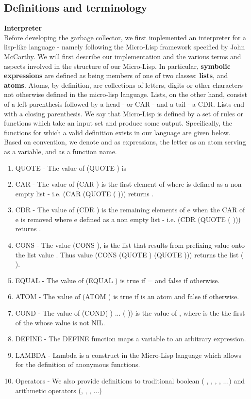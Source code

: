 \documentclass[11pt,leqno]{article}
\newcommand{\mydef}[1]{\textbf{#1}}
\begin{document}
\subsection{Definitions and terminology}
\textbf{Interpreter}\\
Before developing the garbage collector, we first implemented an interpreter for a lisp-like language - namely following the Micro-Lisp framework specified by John McCarthy\cite{mccarthy}. We will first describe our implementation and the various terms and aspects involved in the structure of our Micro-Lisp. In particular, \mydef{symbolic expressions} are defined as being members of one of two classes: \mydef{lists}, and \mydef{atoms}. Atoms, by definition, are collections of letters, digits or other characters not otherwise defined in the micro-lisp language. Lists, on the other hand, consist of a left parenthesis followed by a head - or CAR -  and a tail - a CDR. Lists end with a closing parenthesis. We say that Micro-Lisp is defined by a set of rules or functions which take an input set and produce some output. Specifically, the functions for which a valid definition exists in our language are given below. Based on convention, we denote \bm{} and \bm{} as expressions, the letter \bm{} as an atom serving as a variable, and \bm{} as a function name.
\begin{enumerate}
  \item QUOTE - The value of (QUOTE ) is 
  \item CAR - The value of (CAR ) is the first element of  where  is defined as a non empty list - i.e. (CAR (QUOTE ( ))) returns . 
  \item CDR - The value of (CDR ) is the remaining elements of e when the CAR of e is removed where e defined as a non empty list - i.e. (CDR (QUOTE ( ))) returns . 
  \item CONS - The value (CONS  ), is the list that results from prefixing value  onto the list value . Thus value (CONS (QUOTE ) (QUOTE ))) returns the list ( ).
  \item EQUAL - The value of (EQUAL  ) is true if  =  and false if otherwise.
  \item ATOM - The value of (ATOM ) is true if  is an atom and false if otherwise.
  \item COND - The value of (COND( ) ... ( )) is the value of , where  is the the 
first of the  whose value is not NIL.
  \item DEFINE - The DEFINE function maps a variable to an arbitrary expression.
  \item LAMBDA - Lambda is a construct in the Micro-Lisp language which allows for the definition of anonymous functions.
  \item Operators - We also provide definitions to traditional boolean ( , , , , ...) and arithmetic operators (, , , ...)
\end{enumerate}
\end{document}

